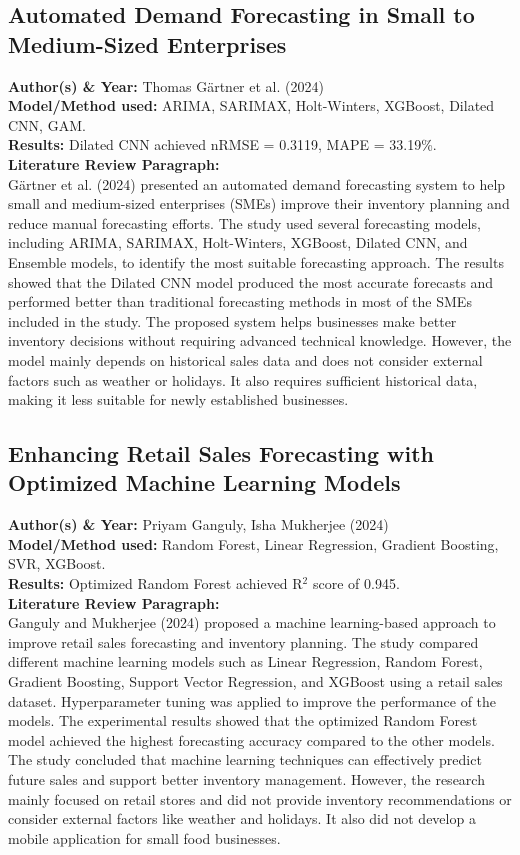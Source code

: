 \documentclass[conference]{IEEEtran}
\begin{document}
\subsection{Automated Demand Forecasting in Small to Medium-Sized Enterprises}
\textbf{Author(s) \& Year:} Thomas Gärtner et al. (2024)\\
\textbf{Model/Method used:} ARIMA, SARIMAX, Holt-Winters, XGBoost, Dilated CNN, GAM.\\
\textbf{Results:} Dilated CNN achieved nRMSE = 0.3119, MAPE = 33.19\%.\\
\textbf{Literature Review Paragraph:}\\
Gärtner et al. (2024) presented an automated demand forecasting system to help small and medium-sized enterprises (SMEs) improve their inventory planning and reduce manual forecasting efforts. The study used several forecasting models, including ARIMA, SARIMAX, Holt-Winters, XGBoost, Dilated CNN, and Ensemble models, to identify the most suitable forecasting approach. The results showed that the Dilated CNN model produced the most accurate forecasts and performed better than traditional forecasting methods in most of the SMEs included in the study. The proposed system helps businesses make better inventory decisions without requiring advanced technical knowledge. However, the model mainly depends on historical sales data and does not consider external factors such as weather or holidays. It also requires sufficient historical data, making it less suitable for newly established businesses.

\subsection{Enhancing Retail Sales Forecasting with Optimized Machine Learning Models}
\textbf{Author(s) \& Year:} Priyam Ganguly, Isha Mukherjee (2024)\\
\textbf{Model/Method used:} Random Forest, Linear Regression, Gradient Boosting, SVR, XGBoost.\\
\textbf{Results:} Optimized Random Forest achieved R$^2$ score of 0.945.\\
\textbf{Literature Review Paragraph:}\\
Ganguly and Mukherjee (2024) proposed a machine learning-based approach to improve retail sales forecasting and inventory planning. The study compared different machine learning models such as Linear Regression, Random Forest, Gradient Boosting, Support Vector Regression, and XGBoost using a retail sales dataset. Hyperparameter tuning was applied to improve the performance of the models. The experimental results showed that the optimized Random Forest model achieved the highest forecasting accuracy compared to the other models. The study concluded that machine learning techniques can effectively predict future sales and support better inventory management. However, the research mainly focused on retail stores and did not provide inventory recommendations or consider external factors like weather and holidays. It also did not develop a mobile application for small food businesses.
\end{document}

